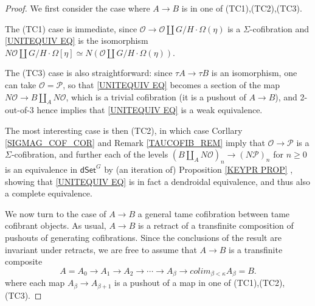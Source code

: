 \documentclass[a4paper,10pt
,draft
]{article}%
\renewcommand{\1}{\eta}%
\begin{document}
\begin{proof}
	We first consider the case where $A\to B$ is in one of (TC1),(TC2),(TC3). 
	
	The (TC1) case is immediate, 
	since $\mathcal{O} \to \mathcal{O} \amalg G/H \cdot \Omega(\eta)$ is a $\Sigma$-cofibration and
	\eqref{UNITEQUIV EQ}
	is the isomorphism
	$N\mathcal{O} \amalg G/H\cdot \Omega[\eta] \simeq 
	N\left( \mathcal{O} \amalg G/H \cdot \Omega(\eta) \right)$.

	The (TC3) case is also straightforward:
	since $\tau A \to \tau B$ is an isomorphism, one can take 
	$\mathcal{O}=\mathcal{P}$, so that 
	\eqref{UNITEQUIV EQ} becomes a section of the map
	$N \mathcal{O} \to B \amalg_{A} N \mathcal{O}$, which is a trivial cofibration (it is a pushout of $A \to B$),
	and 2-out-of-3 hence implies that \eqref{UNITEQUIV EQ} is a weak equivalence.

	The most interesting case is then (TC2), in which case
        Corllary \ref{SIGMAG_COF_COR} and Remark \ref{TAUCOFIB_REM}
        imply that $\mathcal{O} \to \mathcal{P}$ is a $\Sigma$-cofibration,
	and further each of the levels
        $(B \amalg_{A} N \mathcal{O})_n
        \to 
        (N \mathcal{P})_n$
        for $n \geq 0$
        is an equivalence in $\mathsf{dSet}^G$ by (an iteration of)
        Proposition \ref{KEYPR PROP} ,        
        showing that \eqref{UNITEQUIV EQ} is in fact a dendroidal equivalence, and thus also a complete equivalence.
        
        We now turn to the case of $A \to B$ a general tame cofibration between tame cofibrant objects.
	As usual, $A \to B$ is a retract of a transfinite composition of pushouts of generating cofibrations.
	Since the conclusions of the result are invariant under retracts,
	we are free to assume that $A \to B$ is a transfinite composite
\[
A = A_0 \to A_1 \to A_2 \to \cdots \to A_{\beta} \to 
colim_{\beta < \kappa} A_{\beta} = B.
\]
where each map $A_{\beta} \to A_{\beta +1}$ is a pushout of a map in one of (TC1),(TC2),(TC3).


\end{proof}
\end{document}
